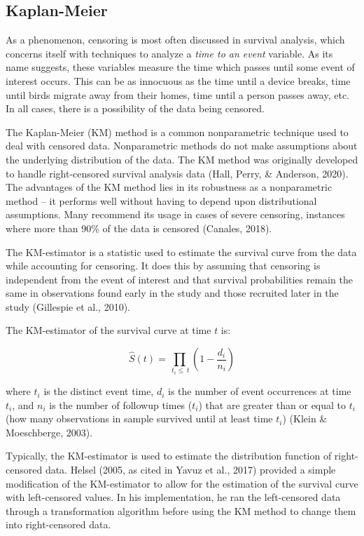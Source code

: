 \documentclass[12pt, twoside]{amherstthesis}
\begin{document}
\hypertarget{rkm}{%
\subsection{Kaplan-Meier}\label{rkm}}

As a phenomenon, censoring is most often discussed in survival analysis, which concerns itself with techniques to analyze a \emph{time to an event} variable. As its name suggests, these variables measure the time which passes until some event of interest occurs. This can be as innocuous as the time until a device breaks, time until birds migrate away from their homes, time until a person passes away, etc. In all cases, there is a possibility of the data being censored.

The Kaplan-Meier (KM) method is a common nonparametric technique used to deal with censored data. Nonparametric methods do not make assumptions about the underlying distribution of the data. The KM method was originally developed to handle right-censored survival analysis data (Hall, Perry, \& Anderson, 2020). The advantages of the KM method lies in its robustness as a nonparametric method -- it performs well without having to depend upon distributional assumptions. Many recommend its usage in cases of severe censoring, instances where more than 90\% of the data is censored (Canales, 2018).

The KM-estimator is a statistic used to estimate the survival curve from the data while accounting for censoring. It does this by assuming that censoring is independent from the event of interest and that survival probabilities remain the same in observations found early in the study and those recruited later in the study (Gillespie et al., 2010).

The KM-estimator of the survival curve at time \(t\) is:

\[\hat{S}(t) = \prod_{\ t_i \le \ t }\left(1-\frac{d_i}{n_i}\right)\]

where \(t_i\) is the distinct event time, \(d_i\) is the number of event occurrences at time \(t_i\), and \(n_i\) is the number of followup times (\(t_i\)) that are greater than or equal to \(t_i\) (how many observations in sample survived until at least time \(t_i\)) (Klein \& Moeschberge, 2003).

Typically, the KM-estimator is used to estimate the distribution function of right-censored data. Helsel (2005, as cited in Yavuz et al., 2017) provided a simple modification of the KM-estimator to allow for the estimation of the survival curve with left-censored values. In his implementation, he ran the left-censored data through a transformation algorithm before using the KM method to change them into right-censored data.
\end{document}
